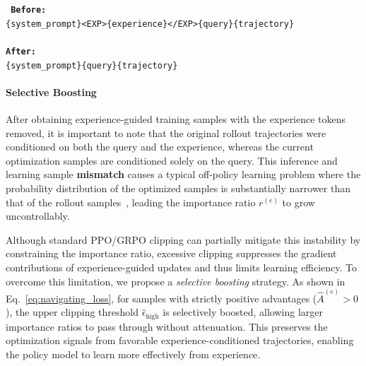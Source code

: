\begin{center}
\begin{tcolorbox}[
  title=An illustration of \emph{Experience Stripping},
  width=16cm,
  boxrule=0.45mm,
  fonttitle=\bfseries,
  enhanced,
  sharp corners,
  colback=white,
  colframe=black!70,
  arc=0mm,
  pad at break=2mm,
  outer arc=0mm
]
\texttt{%
\textbf{Before:} \\ 
\{system\_prompt\}\colorbox{gray!15}{<EXP>\{experience\}</EXP>}\{query\}\{trajectory\} \\
\\
\textbf{After:} \\
\{system\_prompt\}\{query\}\{trajectory\}
}
\end{tcolorbox}
\label{fig:experience stripping}
\end{center}



\paragraph{Selective Boosting}
After obtaining experience-guided training samples with the experience tokens removed, it is important to note that the original rollout trajectories were conditioned on both the query and the experience, whereas the current optimization samples are conditioned solely on the query. This inference and learning sample \textbf{mismatch} causes a typical off-policy learning problem where the probability distribution of the optimized samples is substantially narrower than that of the rollout samples~\citep{yan2025learning}, leading the importance ratio $r^{(e)}$ to grow uncontrollably. 




Although standard PPO/GRPO clipping can partially mitigate this instability by constraining the importance ratio, excessive clipping suppresses the gradient contributions of experience-guided updates and thus limits learning efficiency. To overcome this limitation, we propose a \emph{selective boosting} strategy. As shown in Eq.~\eqref{eq:navigating_loss}, for samples with strictly positive advantages ($\hat{A}^{(e)} > 0$), the upper clipping threshold $\hat{\epsilon}_{\text{high}}$ is selectively boosted, allowing larger importance ratios to pass through without attenuation. This preserves the optimization signals from favorable experience-conditioned trajectories, enabling the policy model to learn more effectively from experience.




